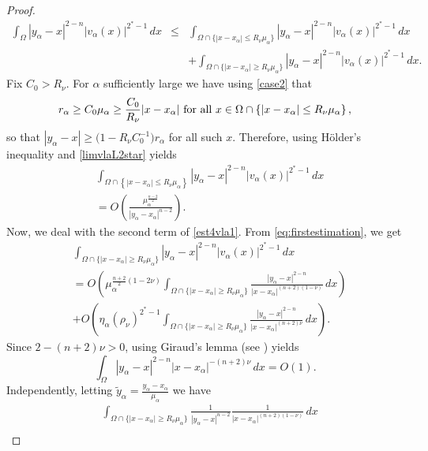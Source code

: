 \documentclass[10pt]{amsart}
\numberwithin{equation}{section}
\newcommand{\Om}{\Omega}
\newcommand{\ma}{\mu_\alpha}
\def \bb{\hbox}
\def \xl{x_\alpha}
\def\la{\alpha}
\def \ma{\mu_{\alpha}}
\def \yl{y_{\alpha}}
\def \Ru{R_{\nu}}
\def \ro{\rho}
\theoremstyle{plain}
\theoremstyle{remark}
\begin{document}
\begin{proof}
\begin{eqnarray}
	\int_{\Om} |\yl-x|^{2-n} \big|v_{\la}(x)\big|^{2^*-1}\, dx
	&\leq& \int_{\Om \cap \{|x-\xl|\leq R_{\nu} \ma\}}|\yl-x|^{2-n} |v_{\la}(x)|^{2^*-1}\, dx\nonumber\\
	&&+\int_{\Om \cap \{|x-\xl|\geq R_{\nu} \ma\}}|\yl-x|^{2-n} |v_{\la}(x)|^{2^*-1}\, dx.
\end{eqnarray} 
Fix $C_0>R_{\nu}$. For $\la$ sufficiently large we have using \eqref{case2} that 
\begin{equation*}
r_{\la}\geq C_0 \ma \geq \frac{C_0}{\Ru}|x-\xl| \bb{ for all } x\in \Om \cap \left\lbrace |x-\xl|\leq \Ru \ma\right\rbrace,
\end{equation*}
so that $|\yl-x|\geq\big( 1-\Ru C_0^{-1}\big) r_{\la}$ for all such $x$. Therefore,  using H\"older's inequality and \eqref{limvlaL2star} yields
\begin{equation}\label{firstterm}
\begin{aligned}
&	\int_{\Om \cap \left\lbrace |x-\xl|\leq \Ru \ma\right\rbrace }|\yl-x|^{2-n} \big|v_{\la}(x)\big|^{2^*-1}\, dx\\
& =  O\left( \frac{\ma^{\frac{n-2}{2}}}{|\yl-\xl|^{n-2}}\right).
\end{aligned}
\end{equation}
Now, we deal with the second term of \eqref{est4vla1}. From \eqref{eq:firstestimation}, we get 
\begin{equation}\label{sect}
\begin{aligned}
&	\int_{\Om \cap \{|x-\xl|\geq \Ru \ma\}}|\yl-x|^{2-n} \big|v_{\la}(x)\big|^{2^*-1}\, dx\nonumber\\
&= O \left( \ma^{\frac{n+2}{2}(1-2\nu)}\int_{\Om \cap \{|x-\xl|\geq \Ru \ma\}}   \frac{|\yl-x|^{2-n}}{|x-\xl|^{(n+2)(1-\nu)}}\, dx \right) \\
&+O \left( \eta_{\la}(\ro_{\nu})^{2^*-1}\int_{\Om \cap \{|x-\xl|\geq \Ru \ma\}}\frac{|\yl-x|^{2-n}}{|x-\xl|^{(n+2)\nu}} \, dx \right).\nonumber
\end{aligned} 
\end{equation} 
Since $2-(n+2)\nu>0$, using Giraud's lemma (see \cite[Lemma 7.5]{HebeyZLAM}) yields
\begin{equation}\label{Giraud1}
\int_{\Om}|\yl-x|^{2-n}|x-\xl|^{-(n+2)\nu} \, dx
=O(1).
\end{equation}
Independently, letting $\tilde{y}_{\alpha} = \frac{y_\alpha - \xl}{\ma}$ we have 
\begin{equation} \label{secondtermbis}
\begin{aligned}
&\int_{\Om \cap \{|x-\xl|\geq \Ru\ma\}}   \frac{1}{|\yl-x|^{n-2}}\frac{1}{|x-\xl|^{(n+2)(1-\nu)}}\, dx\\

\end{aligned}
\end{equation}
\end{proof}
\end{document}
